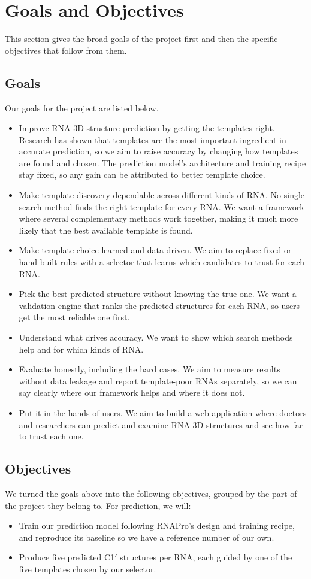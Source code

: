 \documentclass{FastFyp}
\begin{document}
\section{Goals and Objectives}
This section gives the broad goals of the project first and then the specific objectives that follow from them.

\subsection{Goals}
Our goals for the project are listed below.
\begin{itemize}
\item Improve RNA 3D structure prediction by getting the templates right. Research has shown that templates are the most important ingredient in accurate prediction, so we aim to raise accuracy by changing how templates are found and chosen. The prediction model's architecture and training recipe stay fixed, so any gain can be attributed to better template choice.
\item Make template discovery dependable across different kinds of RNA. No single search method finds the right template for every RNA. We want a framework where several complementary methods work together, making it much more likely that the best available template is found.
\item Make template choice learned and data-driven. We aim to replace fixed or hand-built rules with a selector that learns which candidates to trust for each RNA.
\item Pick the best predicted structure without knowing the true one. We want a validation engine that ranks the predicted structures for each RNA, so users get the most reliable one first.
\item Understand what drives accuracy. We want to show which search methods help and for which kinds of RNA.
\item Evaluate honestly, including the hard cases. We aim to measure results without data leakage and report template-poor RNAs separately, so we can say clearly where our framework helps and where it does not.
\item Put it in the hands of users. We aim to build a web application where doctors and researchers can predict and examine RNA 3D structures and see how far to trust each one.
\end{itemize}

\subsection{Objectives}
\label{sec:objectives}
We turned the goals above into the following objectives, grouped by the part of the project they belong to. For prediction, we will:
\begin{itemize}
\item Train our prediction model following RNAPro's design and training recipe, and reproduce its baseline so we have a reference number of our own.
\item Produce five predicted C1$'$ structures per RNA, each guided by one of the five templates chosen by our selector.
\end{itemize}
\end{document}
